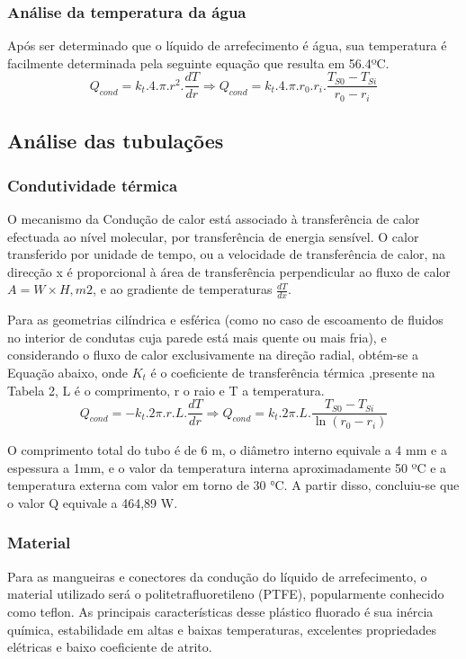 \subsubsection{Análise da temperatura da água}
Após ser determinado que o líquido de arrefecimento é água, sua temperatura é facilmente determinada pela seguinte equação que resulta em 56.4ºC.
$$ Q_{cond} = k_{t}.4.\pi.r^2.\frac{dT}{dr} \Longrightarrow Q_{cond} = k_{t}.4.\pi.r_{0}.r_{i}.\frac{T_{S0}-T_{Si}}{r_{0}-r_{i}}$$


\subsection{Análise das tubulações}

\subsubsection{Condutividade térmica}
O mecanismo da Condução de calor está associado à transferência de calor efectuada ao nível molecular, por transferência de energia sensível. O calor transferido por unidade de tempo, ou a velocidade de transferência de calor, na direcção x é proporcional à área de transferência perpendicular ao fluxo de calor $A=W×H, m2$, e ao gradiente de temperaturas $\frac{dT}{dx}$.

Para as geometrias cilíndrica e esférica (como no caso de escoamento de fluidos no interior de condutas cuja parede está mais quente ou mais fria), e considerando o fluxo de calor exclusivamente na direção radial, obtém-se a Equação abaixo, onde $K_{t}$ é o coeficiente de transferência térmica ,presente na Tabela 2, L é o comprimento, r o raio e T a temperatura.
$$ Q_{cond} = -k_{t}.2\pi.r.L.\frac{dT}{dr} \Longrightarrow Q_{cond} = k_{t}.2\pi.L.\frac{T_{S0}-T_{Si}}{\ln (r_{0}-r_{i})}$$

O comprimento total do tubo é de 6 m, o diâmetro interno equivale a 4 mm e a espessura a 1mm, e o valor da temperatura interna aproximadamente 50 ºC e a temperatura externa com valor em torno de 30 °C. A partir disso, concluiu-se que o valor Q equivale a 464,89 W.

\subsubsection{Material}
Para as mangueiras e conectores da condução do líquido de arrefecimento, o material utilizado será o politetrafluoretileno (PTFE), popularmente conhecido como teflon. As principais características desse plástico fluorado é sua inércia química, estabilidade em altas e baixas temperaturas, excelentes propriedades elétricas e baixo coeficiente de atrito.

